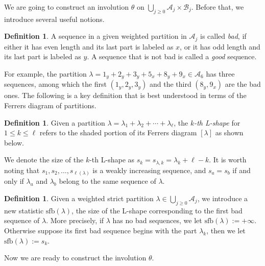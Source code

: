 \documentclass[11pt,reqno]{amsart}
\numberwithin{equation}{section}
\theoremstyle{plain}
\theoremstyle{definition}
\newtheorem{Def}[theorem]{Definition}
\def\A{\mathcal{A}}
\def\la{\lambda}
\def\sfb{\mathrm{sfb}}
\newcommand{\B}{\mathcal{B}}
\begin{document}
We are going to construct an involution $\theta$ on $\bigcup_{j\ge 0}\A_j\times \B_j$. Before that, we introduce several useful notions.
\begin{Def}
A sequence in a given weighted partition in $\A_j$ is called {\it bad}, if either it has even length and its last part is labeled as $x$, or it has odd length and its last part is labeled as $y$. A sequence that is not bad is called a {\it good} sequence.
\end{Def}
For example, the partition $\la=1_y+2_y+3_y+5_x+8_y+9_x\in\A_6$ has three sequences, among which the first $(1_y,2_y,3_y)$ and the third $(8_y,9_x)$ are the bad ones. The following is a key definition that is best understood in terms of the Ferrers diagram of partitions.

\begin{Def}
Given a partition $\la=\la_{1}+\la_{2}+\cdots+\la_{\ell}$, the {\it $k$-th L-shape} for $1\leq k\leq \ell$ refers to the shaded portion of its Ferrers diagram $[\la]$ as shown below.
\begin{ferrers}
\end{ferrers}
\end{Def}

We denote the size of the $k$-th L-shape as $s_{k}=s_{\la,k}=\la_{k}+\ell-k$. It is worth noting that $s_1,s_2,\ldots,s_{\ell(\la)}$ is a weakly increasing sequence, and $s_a=s_b$ if and only if $\la_a$ and $\la_b$ belong to the same sequence of $\la$.

\begin{Def}
Given a weighted strict partition $\la\in\bigcup_{j\ge 0}\A_j$, we introduce a new statistic $\sfb(\la)$, the size of the L-shape corresponding to the first bad sequence of $\la$. More precisely, if $\la$ has no bad sequences, we let $\sfb(\la):=+\infty$. Otherwise suppose its first bad sequence begins with the part $\la_k$, then we let $\sfb(\la):=s_k$. 
\end{Def}
Now we are ready to construct the involution $\theta$.
\end{document}
